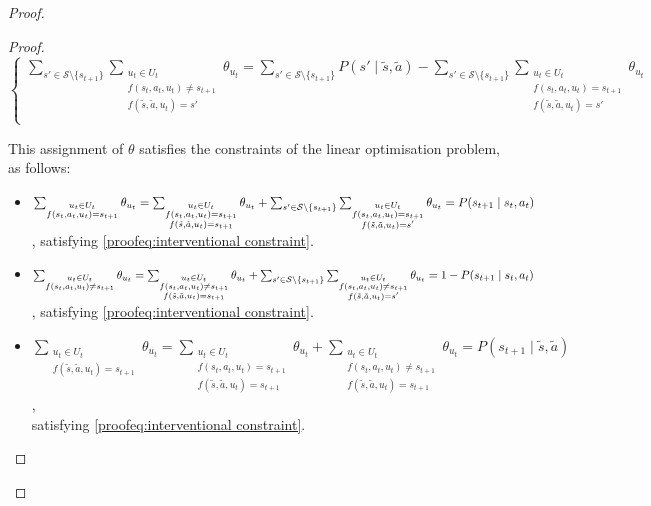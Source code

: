 \begin{proof}
\begin{proof}
\[\begin{cases}
    \sum_{s' \in \mathcal{S}\setminus\{ s_{t+1}\}}\sum_{\substack{u_t \in U_t \\f(s_t, a_t, u_t) \neq s_{t+1} \\ f(\tilde{s}, \tilde{a}, u_t) = s'}}{\theta_{u_t}} = \sum_{s' \in \mathcal{S}\setminus\{s_{t+1}\}}{P(s' \mid \tilde{s}, \tilde{a})} - \sum_{s' \in \mathcal{S}\setminus\{s_{t+1}\}}\sum_{\substack{u_t \in U_t \\f(s_t, a_t, u_t) = s_{t+1} \\ f(\tilde{s}, \tilde{a}, u_t) = s'}}{\theta_{u_t}}\\
\end{cases}
\]

  This assignment of $\theta$ satisfies the constraints of the linear optimisation problem, as follows:

    \begin{itemize}        
    \item $\sum_{\substack{u_t \in U_t \\f(s_t, a_t, u_t) = s_{t+1}}} \theta_{u_t} = \sum_{\substack{u_t \in U_t \\f(s_t, a_t, u_t) = s_{t+1} \\ f(\tilde{s}, \tilde{a}, u_t) = s_{t+1}}} \theta_{u_t} + \sum_{s' \in \mathcal{S}\setminus\{ s_{t+1}\}}\sum_{\substack{u_t \in U_t \\f(s_t, a_t, u_t) = s_{t+1} \\ f(\tilde{s}, \tilde{a}, u_t) = s'}}{\theta_{u_t}} \\ = P(s_{t+1} \mid s_t, a_t)$, satisfying \eqref{proofeq:interventional constraint}.

    \item $\sum_{\substack{u_t \in U_t\\f(s_t, a_t, u_t) \neq s_{t+1}}}{\theta_{u_t}} = \sum_{\substack{u_t \in U_t \\f(s_t, a_t, u_t) \neq s_{t+1} \\ f(\tilde{s}, \tilde{a}, u_t) = s_{t+1}}} \theta_{u_t} + \sum_{s' \in \mathcal{S}\setminus\{ s_{t+1}\}}\sum_{\substack{u_t \in U_t \\f(s_t, a_t, u_t) \neq s_{t+1} \\ f(\tilde{s}, \tilde{a}, u_t) = s'}}{\theta_{u_t}} \\=1 -
    P(s_{t+1} \mid s_t, a_t)$, satisfying \eqref{proofeq:interventional constraint}.

    \item $\sum_{\substack{u_t \in U_t \\f(\tilde{s}, \tilde{a}, u_t) = s_{t+1}}} \theta_{u_t} = \sum_{\substack{u_t \in U_t \\f(s_t, a_t, u_t) = s_{t+1} \\ f(\tilde{s}, \tilde{a}, u_t) = s_{t+1}}} \theta_{u_t} + \sum_{\substack{u_t \in U_t \\f(s_t, a_t, u_t) \neq s_{t+1} \\ f(\tilde{s}, \tilde{a}, u_t) = s_{t+1}}} \theta_{u_t} = P(s_{t+1} \mid \tilde{s}, \tilde{a})$, \\satisfying \eqref{proofeq:interventional constraint}.
    

\end{itemize}
\end{proof}
\end{proof}
